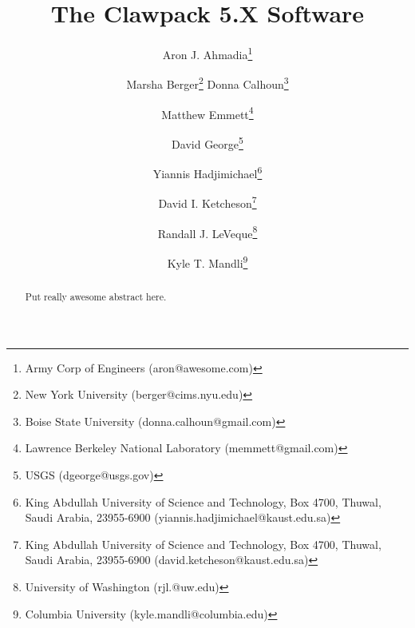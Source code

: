 \documentclass[]{article}
\begin{document}
\ifpdf
{}
\else
{}
\fi

\title{The Clawpack 5.X Software}


\author{
        Aron J. Ahmadia\thanks{
            Army Corp of Engineers (\mbox{aron@awesome.com})} \and
        Marsha Berger\thanks{
            New York University (\mbox{berger@cims.nyu.edu})}
        Donna Calhoun\thanks{
            Boise State University (\mbox{donna.calhoun@gmail.com})} \and
        Matthew Emmett\thanks{
            Lawrence Berkeley National Laboratory (\mbox{memmett@gmail.com})} \and
        David George\thanks{
            USGS (\mbox{dgeorge@usgs.gov})} \and
        Yiannis Hadjimichael\thanks{
            King Abdullah University of Science and Technology, Box 4700, Thuwal, Saudi Arabia, 23955-6900 (\mbox{yiannis.hadjimichael@kaust.edu.sa})} \and
        David I. Ketcheson\thanks{
            King Abdullah University of Science and Technology, Box 4700, Thuwal, Saudi Arabia, 23955-6900 (\mbox{david.ketcheson@kaust.edu.sa})} \and
        Randall J. LeVeque\thanks{
            University of Washington (\mbox{rjl.@uw.edu})} \and
        Kyle T. Mandli\thanks{
            Columbia University (\mbox{kyle.mandli@columbia.edu})}
        }

\maketitle

\begin{abstract}
    Put really awesome abstract here.
\end{abstract}








\end{document}
